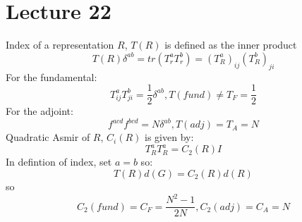 \documentclass{article}
\begin{document}
        \section{Lecture 22}
        Index of a representation $R$, $T(R)$ is defined as the inner product 
        $$T(R) \delta^{ab} = tr( T_r^a T_r^b) = (T_R^a)_{ij} (T_R^b)_{ji}$$
        For the fundamental:
        $$
         T_{ij}^a T_{ji}^b = \frac{1}{2} \delta^{ab}, T(fund) \neq T_F = \frac{1}{2}
        $$
        For the adjoint: 
        $$
         f^{acd} f^{bcd} = N \delta^{ab}, T(adj) = T_A = N
        $$
        Quadratic Asmir of $R$, $C_i(R)$ is given by:
        $$
         T_R^a T_R^a = C_2(R) I
        $$
        In defintion of index, set $a=b$ so:
        $$
         T(R) d(G) = C_2(R) d(R)
        $$
        so
        $$
         C_2(fund) = C_F = \frac{N^2-1}{2N}, C_2(adj) = C_A = N
        $$
\end{document}
